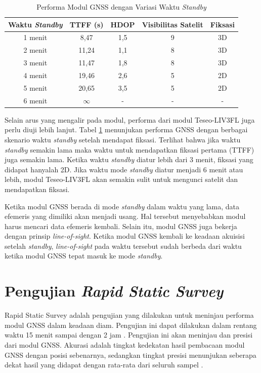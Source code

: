 \begin{table}[H]
	\caption{Performa Modul GNSS dengan Variasi Waktu \textit{Standby}}
	\vspace{0.5em}
	\centering
	\begin{tabular}{ccccc}
		\hline
		\textbf{Waktu \textit{Standby}} &\textbf{TTFF (s)} & \textbf{HDOP} & \textbf{Visibilitas Satelit} & \textbf{Fiksasi}\\
		\hline 
		1 menit & 8,47 & 1,5 & 9 & 3D\\
		2 menit & 11,24 & 1,1 & 8 & 3D\\
		3 menit & 11,47 & 1,8 & 8 & 3D\\
		4 menit & 19,46 & 2,6 & 5 & 2D\\
		5 menit & 20,65 & 3,5 & 5 & 2D\\
		6 menit & $\infty$ & - & - & -\\
		\hline
	\end{tabular}
	\label{Tab: standby-time-test}
\end{table}

Selain arus yang mengalir pada modul, performa dari modul Teseo\hyp{}LIV3FL juga perlu diuji lebih lanjut. Tabel \ref{Tab: standby-time-test} menunjukan performa GNSS dengan berbagai skenario waktu \textit{standby} setelah mendapat fiksasi. Terlihat bahwa jika waktu \textit{standby} semakin lama maka waktu untuk mendapatkan fiksasi pertama (TTFF) juga semakin lama. Ketika waktu \textit{standby} diatur lebih dari 3 menit, fiksasi yang didapat hanyalah 2D. Jika waktu mode \textit{standby} diatur menjadi 6 menit atau lebih, modul Teseo\hyp{}LIV3FL akan semakin sulit untuk mengunci satelit dan mendapatkan fiksasi.

Ketika modul GNSS berada di mode \textit{standby} dalam waktu yang lama, data efemeris yang dimiliki akan menjadi usang. Hal tersebut menyebabkan modul harus mencari data efemeris kembali. Selain itu, modul GNSS juga bekerja dengan prinsip \textit{line-of-sight}. Ketika modul GNSS kembali ke keadaan akuisisi setelah \textit{standby}, \textit{line-of-sight} pada waktu tersebut sudah berbeda dari waktu ketika modul GNSS tepat masuk ke mode \textit{standby}.

\section{Pengujian \textit{Rapid Static Survey}}
Rapid Static Survey adalah pengujian yang dilakukan untuk meninjau performa modul GNSS dalam keadaan diam. Pengujian ini dapat dilakukan dalam rentang waktu 15 menit sampai dengan 2 jam \cite{lauer2019static}. Pengujian ini akan meninjau  dan presisi dari modul GNSS. Akurasi adalah tingkat kedekatan hasil pembacaan modul GNSS dengan posisi sebenarnya, sedangkan tingkat presisi menunjukan seberapa dekat hasil yang didapat dengan rata-rata dari seluruh sampel \cite{gnssca_apn029}.

